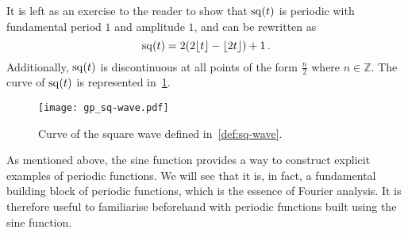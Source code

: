 \noindent It is left as an exercise to the reader to show that $\mathrm{sq}(t)$ is periodic with
fundamental period $1$ and amplitude $1$, and can be rewritten as
\begin{equation}
  \mathrm{sq}(t)=2(2\lfloor t\rfloor-\lfloor 2t\rfloor)+1\,.
\end{equation}
Additionally, $\mathrm{sq}(t)$ is discontinuous at all points of the form $\frac{n}{2}$ where
$n\in\mathbb{Z}$. The curve of $\mathrm{sq}(t)$ is represented in~\cref{fig:sq-wave}.
\begin{figure}[t]
  \centering
  \texttt{[image: gp\_sq-wave.pdf]}
  \caption{Curve of the square wave defined in~\cref{def:sq-wave}.}
  \label{fig:sq-wave}
\end{figure}

As mentioned above, the sine function provides a way to construct explicit examples of
periodic functions. We will see that it is, in fact, a fundamental building block of
periodic functions, which is the essence of Fourier analysis. It is therefore useful to
familiarise beforehand with periodic functions built using the sine function.

